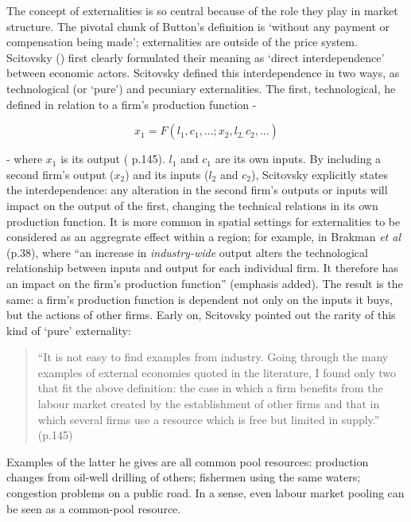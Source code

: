 The concept of externalities is so central because of the role they play in market structure. The pivotal chunk of Button's definition is `without any payment or compensation being made'; externalities are outside of the price system. Scitovsky (\citeyear{scitovsky_two_1954}) first clearly formulated their meaning as `direct interdependence' between economic actors. Scitovsky defined this interdependence in two ways, as technological (or `pure') and pecuniary externalities. The first, technological, he defined in relation to a firm's production function -

\begin{equation}
x_{1}=F(l_{1},c_{1},...;x_{2},l_{2,}c_{2},...)\label{eq:scit1}
\end{equation}

 - where $x_{1}$ is its output (\citealt{scitovsky_two_1954} p.145). $l_{1}$ and $c_{1}$ are its own inputs. By including a second firm's output ($x_{2}$) and its inputs ($l_{2}$ and $c_{2}$), Scitovsky explicitly states the interdependence: any alteration in the second firm's outputs or inputs will impact on the output of the first, changing the technical relations in its own production function. It is more common in spatial settings for externalities to be considered as an aggregrate effect within a region; for example, in Brakman \emph{et al} (p.38), where ``an increase in \emph{industry-wide} output alters the technological relationship between inputs and output for each individual firm. It therefore has an impact on the firm's production function'' (emphasis added). The result is the same: a firm's production function is dependent not only on the inputs it buys, but the actions of other firms. Early on, Scitovsky pointed out the rarity of this kind of `pure' externality: 

\begin{quote}
``It is not easy to find examples from industry. Going through the many examples of external economies quoted in the literature, I found only two that fit the above definition: the case in which a firm benefits from the labour market created by the establishment of other firms and that in which several firms use a resource which is free but limited in supply.'' (p.145) 
\end{quote}

Examples of the latter he gives are all common pool resources: production changes from oil-well drilling of others; fishermen using the same waters; congestion problems on a public road. In a sense, even labour market pooling can be seen as a common-pool resource.

